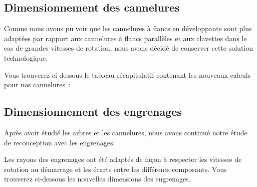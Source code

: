 \documentclass{config}
\begin{document}
\begin{spacing}{1.2}
\subsection{Dimensionnement des cannelures}

Comme nous avons pu voir que les cannelures à flancs en développante sont plus adaptées par rapport aux cannelures à flancs parallèles et aux clavettes dans le cas de grandes vitesses de rotation, nous avons décidé de conserver cette solution technologique.

Vous trouverez ci-dessous le tableau récapitulatif contenant les nouveaux calculs pour nos cannelures :

\begin{table}[h]
\centering
{}
\end{table}


\subsection{Dimensionnement des engrenages}

Après avoir étudié les arbres et les cannelures, nous avons continué notre étude de reconception avec les engrenages. 

Les rayons des engrenages ont été adaptés de façon à respecter les vitesses de rotation au démarrage et les écarts entre les différents composants. Vous trouverez ci-dessous les nouvelles dimensions des engrenages.


\begin{table}[h]
\centering
{}
\end{table}


\end{spacing}
\end{document}
